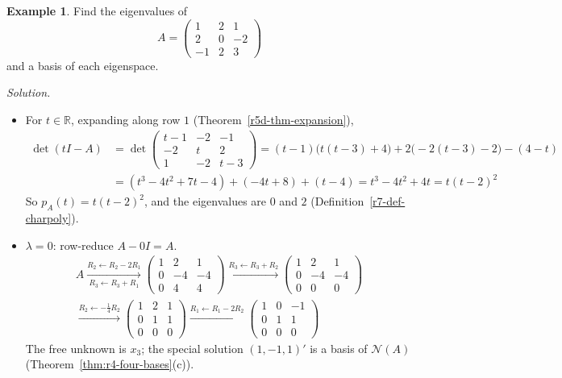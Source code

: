 \documentclass[12pt]{article}
\newcommand{\R}{\mathbb R}
\theoremstyle{definition}
\newtheorem{example}[theorem]{Example}
\begin{document}
\begin{example}\label{r7-exm-charpoly}
Find the eigenvalues of
\[
A=\begin{pmatrix}1&2&1\\2&0&-2\\-1&2&3\end{pmatrix}
\]
and a basis of each eigenspace.

\textit{Solution.}
\begin{itemize}
\item For \(t\in\R\), expanding along row \(1\) (Theorem~\ref{r5d-thm-expansion}),
\[
\begin{aligned}
\det(tI-A)&=\det\begin{pmatrix}t-1&-2&-1\\-2&t&2\\1&-2&t-3\end{pmatrix}
=(t-1)\bigl(t(t-3)+4\bigr)+2\bigl(-2(t-3)-2\bigr)-(4-t)\\
&=(t^3-4t^2+7t-4)+(-4t+8)+(t-4)=t^3-4t^2+4t=t(t-2)^2
\end{aligned}
\]
So \(p_A(t)=t(t-2)^2\), and the eigenvalues are \(0\) and \(2\) (Definition~\ref{r7-def-charpoly}).
\item \(\lambda=0\): row-reduce \(A-0I=A\).
\[
\begin{gathered}
A\xrightarrow[R_3\leftarrow R_3+R_1]{R_2\leftarrow R_2-2R_1}
\begin{pmatrix}1&2&1\\0&-4&-4\\0&4&4\end{pmatrix}
\xrightarrow{R_3\leftarrow R_3+R_2}
\begin{pmatrix}1&2&1\\0&-4&-4\\0&0&0\end{pmatrix}
\\
\xrightarrow{R_2\leftarrow-\frac14R_2}
\begin{pmatrix}1&2&1\\0&1&1\\0&0&0\end{pmatrix}
\xrightarrow{R_1\leftarrow R_1-2R_2}
\begin{pmatrix}1&0&-1\\0&1&1\\0&0&0\end{pmatrix}
\end{gathered}
\]
The free unknown is \(x_3\); the special solution \((1,-1,1)'\) is a basis of \(\mathcal N(A)\)
(Theorem~\ref{thm:r4-four-bases}(c)).

\end{itemize}
\end{example}
\end{document}
